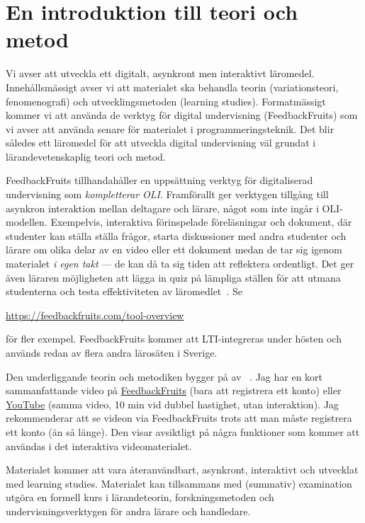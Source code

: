 \documentclass[a4paper,swedish]{article}
\begin{document}
\section{En introduktion till teori och metod}\label{intrometod}

Vi avser att utveckla ett digitalt, asynkront men interaktivt läromedel.
Innehållsmässigt avser vi att materialet ska behandla teorin (variationsteori, 
fenomenografi) och utvecklingsmetoden (learning studies).
Formatmässigt kommer vi att använda de verktyg för digital undervisning 
(FeedbackFruits) som vi avser att använda senare för materialet i 
programmeringsteknik.
Det blir således ett läromedel för att utveckla digital undervisning väl 
grundat i lärandevetenskaplig teori och metod.

FeedbackFruits tillhandahåller en uppsättning verktyg för digitaliserad 
undervisning som \emph{kompletterar OLI}.
Framförallt ger verktygen tillgång till asynkron interaktion mellan deltagare 
och lärare, något som inte ingår i OLI-modellen.
Exempelvis, interaktiva förinspelade föreläsningar och dokument, där studenter 
kan ställa ställa frågor, starta diskussioner med andra studenter och lärare om 
olika delar av en video eller ett dokument medan de tar sig igenom materialet 
\emph{i egen takt} --- de kan då ta sig tiden att reflektera ordentligt.
Det ger även läraren möjligheten att lägga in quiz på lämpliga ställen för att 
utmana studenterna och testa effektiviteten av 
läromedlet~\parencite{NecessaryConditionsOfLearning}.
Se
\begin{center}
  \url{https://feedbackfruits.com/tool-overview}
\end{center}
för fler exempel.
FeedbackFruits kommer att LTI-integreras under hösten och används redan av 
flera andra lärosäten i Sverige.

Den underliggande teorin och metodiken bygger på
av 
\citeauthor{NecessaryConditionsOfLearning}~\parencite*{NecessaryConditionsOfLearning}.
Jag har en kort sammanfattande video på
\href{https://eu.feedbackfruits.com/groups/activity-course/d04b0280-e219-42c4-aee1-1272609bc4bd}{FeedbackFruits} 
(bara att registrera ett konto)
eller
\href{https://youtu.be/_d42-kTKDcI}{YouTube}
(samma video, 10 min vid dubbel hastighet, utan interaktion).
Jag rekommenderar att se videon via FeedbackFruits trots att man måste 
registrera ett konto (än så länge). Den visar avsiktligt på några funktioner 
som kommer att användas i det interaktiva videomaterialet. 

Materialet kommer att vara återanvändbart, asynkront, interaktivt och utvecklat 
med learning studies. Materialet kan tillsammans med (summativ) examination 
utgöra en formell kurs i lärandeteorin, forskningsmetoden och 
undervisningsverktygen för andra lärare och handledare.
\end{document}
